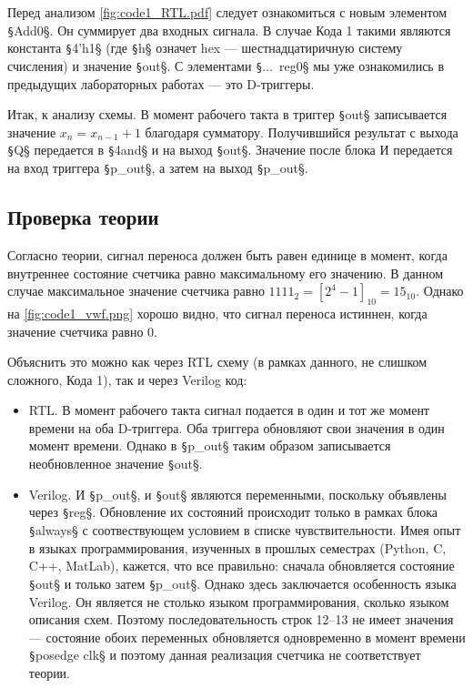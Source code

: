 Перед анализом \cref{fig:code1_RTL.pdf} следует ознакомиться с новым элементом \texttt§Add0§. Он суммирует два входных сигнала. В случае Кода 1 такими являются константа \texttt§4'h1§ (где \texttt§h§ означет hex --- шестнадцатиричную систему счисления) и значение \texttt§out§. С элементами \texttt§...~reg0§ мы уже ознакомились в предыдущих лабораторных работах --- это D-триггеры.

Итак, к анализу схемы. В момент рабочего такта в триггер \texttt§out§ записывается значение $x_n = x_{n-1} + 1$ благодаря сумматору. Получившийся результат с выхода \texttt§Q§ передается в \texttt§4and§ и на выход \texttt§out§. Значение после блока И передается на вход триггера \texttt§p_out§, а затем на выход \texttt§p_out§.

\subsection*{Проверка теории}

Согласно теории, сигнал переноса должен быть равен единице в момент, когда внутреннее состояние счетчика равно максимальному его значению. В данном случае максимальное значение счетчика равно $1111_2=[2^4-1]_{10}=15_{10}$. Однако на \cref{fig:code1_vwf.png} хорошо видно, что сигнал переноса истиннен, когда значение счетчика равно $0$.

Объяснить это можно как через RTL схему (в рамках данного, не слишком сложного, Кода 1), так и через Verilog код:
\begin{itemize}
    \item RTL. В момент рабочего такта сигнал подается в один и тот же момент времени на оба D-триггера. Оба триггера обновляют свои значения в один момент времени. Однако в \texttt§p_out§ таким образом записывается необновленное значение \texttt§out§.
    \item Verilog. И \texttt§p_out§, и \texttt§out§ являются переменными, поскольку объявлены через \texttt§reg§. Обновление их состояний происходит только в рамках блока \texttt§always§ с соотвествующем условием в списке чувствительности. Имея опыт в языках программирования, изученных в прошлых семестрах (Python, C, C++, MatLab), кажется, что все правильно: сначала обновляется состояние \texttt§out§ и только затем \texttt§p_out§. Однако здесь заключается особенность языка Verilog. Он является не столько языком программирования, сколько языком описания схем. Поэтому последовательность строк 12--13 не имеет значения --- состояние обоих переменных обновляется одновременно в момент времени \texttt§posedge clk§ и поэтому данная реализация счетчика не соответствует теории.
\end{itemize}

